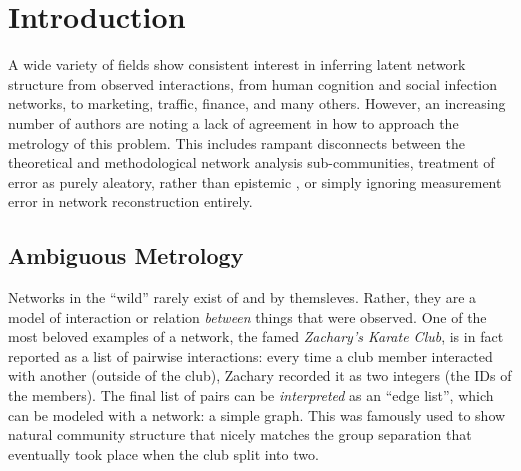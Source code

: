 \documentclass[%
	12pt,
		oneside,
		letterpaper
]{book}
\renewcommand{\contentsname}%
    {Table of contents}%
\renewcommand*\contentsname{Table of contents}
\newcommand\contentsname{Table of contents}
\begin{document}
    \renewcommand{\contentsname}{List of Tables}
\listoftables %
\newpage

    \renewcommand{\contentsname}{List of Figures}
\listoffigures %
\newpage

% 

\newpage
\setlength{\parskip}{0em}
\renewcommand{\baselinestretch}{2}
\small\normalsize



\chapter{Introduction}\label{introduction}

A wide variety of fields show consistent interest in inferring latent
network structure from observed interactions, from human cognition and
social infection networks, to marketing, traffic, finance, and many
others. \autocite{Inferringnetworksdiffusion_GomezRodriguez2012}
However, an increasing number of authors are noting a lack of agreement
in how to approach the metrology of this problem. This includes rampant
disconnects between the theoretical and methodological network analysis
sub-communities\autocite{Statisticalinferencelinks_Peel2022}, treatment
of error as purely aleatory, rather than epistemic
\autocite{Measurementerrornetwork_Wang2012}, or simply ignoring
measurement error in network reconstruction
entirely\autocite{ReconstructingNetworksUnknown_Peixoto2018}.

\section{Ambiguous Metrology}\label{ambiguous-metrology}

Networks in the ``wild'' rarely exist of and by themsleves. Rather, they
are a model of interaction or relation \emph{between} things that were
observed. One of the most beloved examples of a network, the famed
\emph{Zachary's Karate Club}\autocite{InformationFlowModel_Zachary1977},
is in fact reported as a list of pairwise interactions: every time a
club member interacted with another (outside of the club), Zachary
recorded it as two integers (the IDs of the members). The final list of
pairs can be \emph{interpreted} as an ``edge list'', which can be
modeled with a network: a simple graph. This was famously used to show
natural community structure that nicely matches the group separation
that eventually took place when the club split into
two.\autocite{Communitystructuresocial_Girvan2002}
\end{document}
